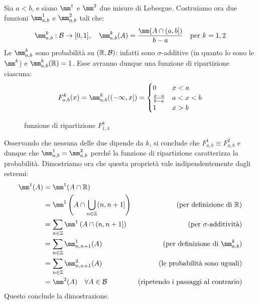 \medskip
\begin{dimo}
  \leavevmode
  Sia $a < b$, e siano $\mm^1$ e $\mm^2$ due misure di Lebesgue. Costruiamo ora due funzioni $\mm_{a,b}^1$ e $\mm_{a,b}^2$ tali che:
  $$\mm_{a,b}^k: \Bc \to [0,1], \quad \mm_{a,b}^k(A) = \frac{\mm(A \cap (a,b])}{b-a} \quad \text{per } k = 1,2$$
  Le $\mm_{a,b}^k$ sono probabilità su $(\mathbb R, \mathcal B)$: infatti sono $\sigma$-additive (in quanto lo sono le $\mm^k$) e $\mm_{a,b}^k(\RR) = 1$.
  Esse avranno dunque una funzione di ripartizione ciascuna:
  $$F_{a,b}^k(x) = \mm_{a,b}^k ((-\infty, x]) = \begin{cases}0 & x < a \\ \frac{x-a}{b-a} & a < x < b \\ 1 & x > b \end{cases}$$

  \begin{figure}[H]
    \centering
    \label{plot-ripartizione-lebesgue}
    \caption{funzione di ripartizione $F_{1,4}^k$}
  \end{figure}

  Osservando che nessuna delle due dipende da $k$, si conclude che $F_{a,b}^1 \equiv F_{a,b}^2$ e dunque che $\mm_{a,b}^1 = \mm_{a,b}^2$ perché la funzione di ripartizione caratterizza la probabilità. Dimostriamo ora che questa proprietà vale indipendentemente dagli estremi:
  \begin{align*}
    \mm^1 (A) &= \mm^1(A \cap \RR) \\
    &= \mm^1 \left(A \cap \bigcup\limits_{n \in \ZZ} (n, n+1] \right) & \text{(per definizione di $\RR$)}\\
    &= \sum\limits_{n \in \ZZ} \mm^1 \left( A \cap (n, n+1] \right) & \text{(per $\sigma$-additività)}\\
    &= \sum\limits_{n \in \ZZ} \mm_{n, n+1}^1 (A) & \text{(per definizione di $\mm_{a,b}^k$)}\\
    &= \sum\limits_{n \in \ZZ} \mm_{n, n+1}^2 (A) & \text{(le probabilità sono uguali)}\\
    &= \mm^2(A) \quad \forall A \in \Bc & \text{(ripetendo i passaggi al contrario)}
  \end{align*}
  Questo conclude la dimostrazione.
\end{dimo}

